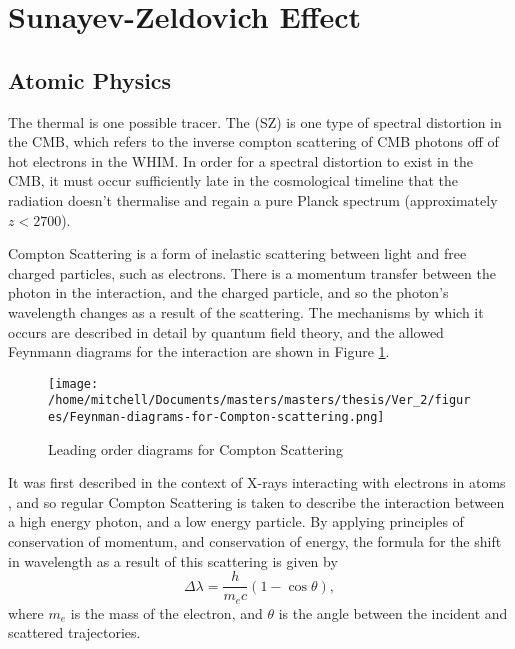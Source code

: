 \section{Sunayev-Zeldovich Effect}

\subsection{Atomic Physics}
The thermal \sze is one possible tracer. The \sze (SZ) is one type of spectral distortion in the CMB, which refers to the inverse compton scattering of CMB photons off of hot electrons in the WHIM. In order for a spectral distortion to exist in the CMB, it must occur sufficiently late in the cosmological timeline that the radiation doesn't thermalise and regain a pure Planck spectrum (approximately $z < 2700$).

Compton Scattering is a form of inelastic scattering between light and free charged particles, such as electrons. There is a momentum transfer between the photon in the interaction, and the charged particle, and so the photon's wavelength changes as a result of the scattering. The mechanisms by which it occurs are described in detail by quantum field theory, and the allowed Feynmann diagrams for the interaction are shown in Figure \ref{fig:compton_scattering}.

\begin{figure}[h!]
\centering
\texttt{[image: /home/mitchell/Documents/masters/masters/thesis/Ver\_2/figures/Feynman-diagrams-for-Compton-scattering.png]}
\label{fig:compton_scattering}
\caption{Leading order diagrams for Compton Scattering }
\label{fig:compton_scattering}
\end{figure}


It was first described in the context of X-rays interacting with electrons in atoms \citep{1923PhRv...21..483C}, and so regular Compton Scattering is taken to describe the interaction between a high energy photon, and a low energy particle. By applying principles of conservation of momentum, and conservation of energy,  the formula for the shift in wavelength as a result of this scattering is given by
\begin{equation}
	\Delta \lambda = \frac{h}{m_ec}\left(1-\cos\theta\right),
	\label{eqn:compton_shift}
\end{equation}
where $m_e$ is the mass of the electron, and $\theta$ is the angle between the incident and scattered trajectories. 


